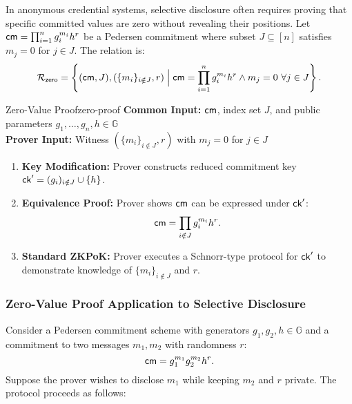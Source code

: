 In anonymous credential systems, selective disclosure often requires proving that specific committed values are zero without revealing their positions. Let \(\mathsf{cm} = \prod_{i=1}^n g_i^{m_i} h^r\) be a Pedersen commitment where subset \(J \subseteq [n]\) satisfies \(m_j = 0\) for \(j \in J\). The relation is:
\[
\mathcal{R}_{\mathsf{zero}} = \left\{ (\mathsf{cm}, J), ( \{m_i\}_{i \notin J}, r) \; \Big| \; \mathsf{cm} = \prod_{i=1}^n g_i^{m_i} h^r \land m_j = 0 \ \forall j \in J \right\}.
\]

\begin{protocol}{Zero-Value Proof}{zero-proof}
\textbf{Common Input:} \(\mathsf{cm}\), index set \(J\), and public parameters \(g_1,\ldots,g_n,h \in \mathbb{G}\)\\
\textbf{Prover Input:} Witness \((\{m_i\}_{i \notin J}, r)\) with \(m_j = 0\) for \(j \in J\)
\begin{enumerate}
    \item \textbf{Key Modification:} Prover constructs reduced commitment key \(\mathsf{ck}' = (g_i)_{i \notin J} \cup \{h\}\).
    
    \item \textbf{Equivalence Proof:} Prover shows \(\mathsf{cm}\) can be expressed under \(\mathsf{ck}'\):
    \[
    \mathsf{cm} = \prod_{i \notin J} g_i^{m_i} h^{r}.
    \]
    
    \item \textbf{Standard ZKPoK:} Prover executes a Schnorr-type protocol for \(\mathsf{ck}'\) to demonstrate knowledge of \(\{m_i\}_{i \notin J}\) and \(r\).
\end{enumerate}
\end{protocol}



\subsubsection{Zero-Value Proof Application to Selective Disclosure}\label{pok-disclose}

Consider a Pedersen commitment scheme with generators \(g_1, g_2, h \in \mathbb{G}\) and a commitment to two messages \(m_1, m_2\) with randomness \(r\):
\[
\mathsf{cm} = g_1^{m_1} g_2^{m_2} h^r.
\]
Suppose the prover wishes to disclose \(m_1\) while keeping \(m_2\) and \(r\) private. The protocol proceeds as follows:

